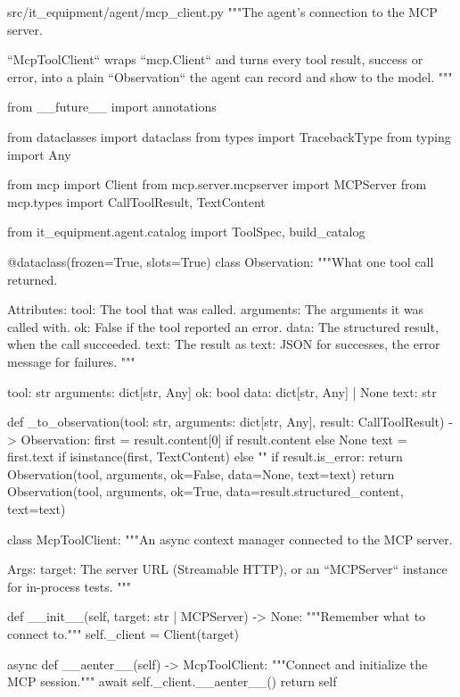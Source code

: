 \documentclass[11pt,letterpaper]{article}
\renewcommand{\_}{\textunderscore\allowbreak}
\begin{document}
\begin{codebox}{src/it_equipment/agent/mcp_client.py}
"""The agent's connection to the MCP server.

``McpToolClient`` wraps ``mcp.Client`` and turns every tool result, success or error, into a
plain ``Observation`` the agent can record and show to the model.
"""

from __future__ import annotations

from dataclasses import dataclass
from types import TracebackType
from typing import Any

from mcp import Client
from mcp.server.mcpserver import MCPServer
from mcp.types import CallToolResult, TextContent

from it_equipment.agent.catalog import ToolSpec, build_catalog


@dataclass(frozen=True, slots=True)
class Observation:
    """What one tool call returned.

    Attributes:
        tool: The tool that was called.
        arguments: The arguments it was called with.
        ok: False if the tool reported an error.
        data: The structured result, when the call succeeded.
        text: The result as text: JSON for successes, the error message for failures.
    """

    tool: str
    arguments: dict[str, Any]
    ok: bool
    data: dict[str, Any] | None
    text: str


def _to_observation(tool: str, arguments: dict[str, Any], result: CallToolResult) -> Observation:
    first = result.content[0] if result.content else None
    text = first.text if isinstance(first, TextContent) else ""
    if result.is_error:
        return Observation(tool, arguments, ok=False, data=None, text=text)
    return Observation(tool, arguments, ok=True, data=result.structured_content, text=text)


class McpToolClient:
    """An async context manager connected to the MCP server.

    Args:
        target: The server URL (Streamable HTTP), or an ``MCPServer`` instance for
            in-process tests.
    """

    def __init__(self, target: str | MCPServer) -> None:
        """Remember what to connect to."""
        self._client = Client(target)

    async def __aenter__(self) -> McpToolClient:
        """Connect and initialize the MCP session."""
        await self._client.__aenter__()
        return self


\end{codebox}
\end{document}

